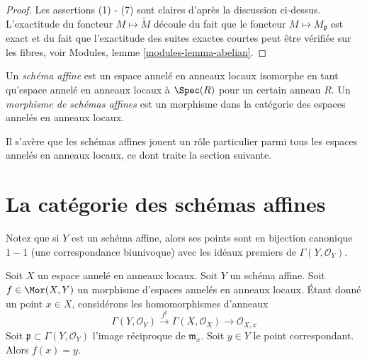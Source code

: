 \begin{proof}
Les assertions (1) - (7) sont claires d'après la discussion
ci-dessus. L'exactitude du foncteur $M \mapsto \widetilde
M$ découle du fait que le foncteur $M \mapsto M_{\mathfrak p}$ est exact
et du fait que l'exactitude des suites exactes courtes peut
être vérifiée sur les fibres, voir
Modules, lemme \ref{modules-lemma-abelian}.
\end{proof}

\begin{definition}
\label{definition-affine-scheme}
Un {\it schéma affine} est un espace annelé en anneaux locaux isomorphe en
tant qu'espace annelé en anneaux locaux à $\Spec(R)$ pour un certain anneau
$R$. Un {\it morphisme de schémas affines} est un morphisme dans la catégorie des
espaces annelés en anneaux locaux.
\end{definition}

\noindent
Il s'avère que les schémas affines jouent un rôle particulier
parmi tous les espaces annelés en anneaux locaux, ce dont traite
la section suivante.


















\section{La catégorie des schémas affines}
\label{section-category-affine-schemes}

\noindent
Notez que si $Y$ est un schéma affine, alors ses points
sont en bijection canonique $1-1$ (une correspondance biunivoque)
avec les idéaux premiers de $\Gamma(Y, \mathcal{O}_Y)$.

\begin{lemma}
\label{lemma-morphism-into-affine-where-point-goes}
Soit $X$ un espace annelé en anneaux locaux.
Soit $Y$ un schéma affine. Soit $f
\in \Mor(X, Y)$ un morphisme d'espaces annelés
en anneaux locaux. Étant donné un point $x \in X$, considérons
les homomorphismes d'anneaux
$$
\Gamma(Y, \mathcal{O}_Y) \xrightarrow{f^\sharp}
\Gamma(X, \mathcal{O}_X) \to \mathcal{O}_{X, x}
$$
Soit $\mathfrak p \subset \Gamma(Y, \mathcal{O}_Y)$ l'image
réciproque de $\mathfrak m_x$. Soit $y \in Y$ le point
correspondant. Alors $f(x) = y$.
\end{lemma}

